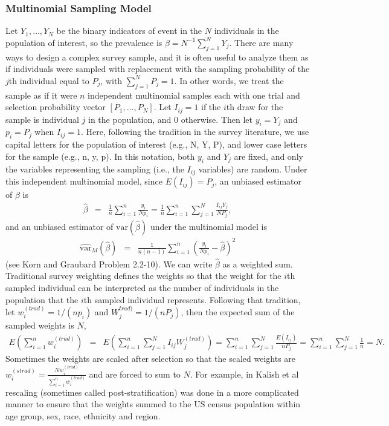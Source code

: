 \subsubsection{Multinomial Sampling Model}
\label{ch_3:sec-MultPoisson}

Let $Y_1,\ldots, Y_N$ be the binary indicators of event in the $N$ individuals in the population of interest,
so the prevalence is $\beta = N^{-1} \sum_{j=1}^{N} Y_j$. There are many ways to design a complex survey sample, and it is often useful to analyze them as if
individuals were sampled with replacement with the sampling probability of the $j$th individual equal to $P_j$, with $\sum_{j=1}^{N} P_j = 1.$
In other words, we treat the sample as if it were $n$ independent multinomial samples each with one trial and selection probability vector $[P_1,\ldots, P_N]$.
Let $I_{ij}=1$ if the $i$th draw for the sample is individual $j$ in the population, and $0$ otherwise. Then let $y_i = Y_j$ and $p_i=P_j$ when $I_{ij}=1$.
Here, following the tradition in the survey literature, we use capital letters for the population of interest (e.g., N, Y, P), and lower case letters for the sample (e.g., n, y, p).
In this notation, both $y_i$ and $Y_j$ are fixed, and only the variables representing the sampling (i.e., the $I_{ij}$ variables) are random.
Under this independent multinomial model, since $E(I_{ij})=P_j$, an unbiased estimator of $\beta$ is
\begin{eqnarray}
\hat{\beta} & = & \frac{1}{n} \sum_{i=1}^{n} \frac{ y_i}{N p_i} = \frac{1}{n} \sum_{i=1}^{n} \sum_{j=1}^{N} \frac{ I_{ij} Y_j}{N P_j},
\label{ch_3:eq:betahatMultinomial}
\end{eqnarray}
and an unbiased estimator of $\textrm{var}(\hat{\beta})$ under the multinomial model is
\begin{eqnarray}
\widehat{\textrm{var}}_{M}(\hat{\beta}) & = & \frac{1}{n (n-1)} \sum_{i=1}^{n} \left( \frac{y_i}{Np_i} - \hat{\beta} \right)^2
\label{ch_3:eq:varMbetahat}
\end{eqnarray}
(see Korn and Graubard\cite{Korn:1999} Problem 2.2-10). We can write $\hat{\beta}$ as a weighted sum. Traditional survey weighting defines the weights so that
the weight for the $i$th sampled individual can be interpreted as the number of individuals in the population that the $i$th sampled individual represents.
Following that tradition, let $w_i^{(trad)}= 1/(np_i)$ and $W_j^{trad)}=1/(nP_j)$, then the expected sum of the sampled weights is $N$,
\begin{eqnarray*}
E \left( \sum_{i=1}^{n} w_i^{(trad)} \right) & = & E \left( \sum_{i=1}^{n} \sum_{j=1}^{N} I_{ij} W_j^{(trad)} \right) = \sum_{i=1}^{n} \sum_{j=1}^{N} \frac{ E(I_{ij})}{ n P_j} = \sum_{i=1}^{n} \sum_{j=1}^{N} \frac{1}{n} = N.
\end{eqnarray*}
Sometimes the weights are scaled after selection so that the scaled weights are $w_i^{(strad)} = \frac{ N w_i^{(trad)} }{\sum_{i=1}^{n} w_i^{(trad)}}$ and are forced to sum to $N$.
For example, in Kalish et al\cite{Kali:2021} rescaling (sometimes called post-stratification) was done in a more complicated manner to ensure that the weights summed to the US census population within age group, sex, race, ethnicity and region.



